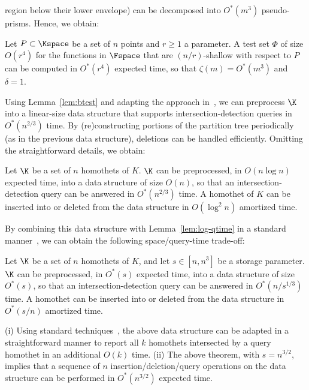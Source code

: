 region below their lower envelope) can be decomposed into $O^*(m^3)$ pseudo-prisms. Hence, we obtain:
\begin{lemma} \label{lem:btest}
Let $P\subset \Kspace$ be a set of $n$ points and $r\ge 1$ a parameter. A test set $\Phi$ 
	of size $O(r^4)$ for the functions in $\Fspace$ that are $(n/r)$-shallow 
	with respect to $P$ can be computed in $O^*(r^4)$ expected time, so that
	$\zeta(m)=O^*(m^3)$ and $\delta=1$.
\end{lemma}
%
Using Lemma~\ref{lem:btest} and adapting the approach in~\cite{ShSh}, we can preprocess $\K$ into
a linear-size data structure that supports intersection-detection queries in $O^*(n^{2/3})$ time. 
By (re)constructing portions of the partition tree periodically (as in the previous data structure), 
deletions can be handled efficiently. Omitting the straightforward details, we obtain:
%
\begin{lemma}
	\label{lem:linear-qtime}
Let $\K$ be a set of $n$ homothets of $K$.  $\K$ can be preprocessed,
in $O(n\log n)$ expected time, into a data structure of size $O(n)$, so that an intersection-detection query 
can be answered in $O^*(n^{2/3})$ time. A homothet of $K$ 
can be inserted into or deleted from the data structure in $O(\log^2 n)$ amortized time.
\end{lemma}
%
By combining this data structure with Lemma~\ref{lem:log-qtime} in a 
standard manner~\cite{AAEKS}, we can 
obtain the following space/query-time trade-off:
\begin{theorem}
	\label{thm:tradeoff}
	Let $\K$ be a set of $n$ homothets of $K$, and let $s\in[n,n^3]$ be a storage parameter.  
        $\K$ can be preprocessed, in $O^*(s)$ expected time, into a data structure of size $O^*(s)$, so 
	that an intersection-detection query can be answered 
	in $O^*(n/s^{1/3})$ time. A homothet can be inserted into 
	or deleted from the data structure in $O^*(s/n)$ amortized time.
\end{theorem}
%
\iffullver
\begin{remark} 
	\label{rem:ds}
	(i) Using standard techniques~\cite{Mat92,AM95}, the above data structure can be adapted in a 
        straightforward manner to report all $k$ homothets intersected by 
	a query homothet in an additional $O(k)$ time.
%
	(ii) The above theorem, with $s = n^{3/2}$, implies that a sequence of $n$ insertion/deletion/query 
        operations on the data structure can be performed in $O^*(n^{3/2})$ expected time.
\end{remark}

